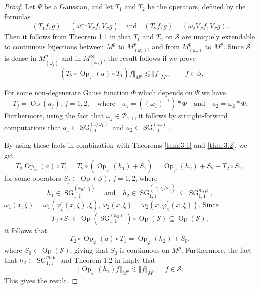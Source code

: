 \documentclass[12pt,a4paper,reqno]{amsart}
\numberwithin{equation}{section}
\numberwithin{thm}{section}
\theoremstyle{definition}
\theoremstyle{remark}
\begin{document}
\begin{proof}
Let $\Psi$ be a Gaussian, and let $T_1$ and $T_2$ be the operators, defined
by the formulas
$$
(T_1f,g) = (\omega _1^{-1}V_\Psi f,V_\Psi g)\quad \text{and}\quad(T_2f,g) =
(\omega _2V_\Psi f,V_\Psi g).
$$
Then it follows from Theorem 1.1 in \cite{GT} that $T_1$ and $T_2$
on $\mathscr S$ are uniquely extendable to continuous bijections between
$M^{p}$ to $M^{p}_{(\omega _1)}$, and from $M^{p}_{(\omega _2)}$
to $M^{p}$. Since ${{\mathscr S}}$ is dense in $M^p_{(\omega _j)}$ and in
$M^\infty _{(\omega _j)}$, the result follows if we prove
$$
{\Vert {(T_2 \circ {\operatorname{Op}}_\varphi(a)\circ T_1)f}\Vert _{{M^p}}}\lesssim {\Vert f\Vert _{{M^p}}},\qquad f\in {{\mathscr S}} .
$$

\par

For some non-degenerate Gauss function $\Phi$ which depends on $\Psi$
we have
$$
T_j = {\operatorname{Op}} ( a_j ),\ j=1,2,\quad \text{where}\quad
a_1= ((\omega _1)^{-1})*\Phi \quad \text{and}\quad
a_2 = \omega _2*\Phi .
$$
Furthermore, using the fact that $\omega _j\in {\mathscr P} _{1,1}$, it follows by
straight-forward computations that $a_1\in {\operatorname{SG}} ^{(1/\omega _1)}_{1,1}$ and
$a_2\in {\operatorname{SG}} ^{(\omega _2)}_{1,1}$.

\par

By using these facts in combination with Theorems \ref{thm:3.1} and
\ref{thm:3.2}, we get
$$
T_2 {\operatorname{Op}}_\varphi(a)\circ T_1 =T_2\circ ({\operatorname{Op}}_\varphi(h_1) +S_1) = {\operatorname{Op}}_\varphi(h_2)+
S_2+T_2\circ S_1,
$$
for some operators $S_j\in {\operatorname{Op}} ({{\mathscr S}} )$, $j=1,2$, where
$$
h_1\in {\operatorname{SG}} ^{(\omega _0/\widetilde{\omega} _1)}_{1,1}\quad \text{and}\quad
h_2\in {\operatorname{SG}} ^{(\omega _0\widetilde{\omega} _2/\widetilde{\omega} _1)}_{1,1}\subseteq
{\operatorname{SG}} ^{m,\mu}_{1,1},
$$
$\widetilde{\omega}_1(x,\xi)=\omega_1(\varphi^\prime_\xi(x,\xi),\xi)$, 
$\widetilde{\omega}_2(x,\xi)=\omega_2(x,\varphi^\prime_x(x,\xi) )$. Since
$$
T_2\circ S_1 \in {\operatorname{Op}} ({\operatorname{SG}} ^{(\omega _2)}_{1,1})\circ {\operatorname{Op}} (\mathscr S)
\subseteq {\operatorname{Op}} (\mathscr S),
$$
it follows that
$$
T_2 \circ {\operatorname{Op}}_\varphi(a)\circ T_1 = {\operatorname{Op}}_\varphi(h_2)+S_0,
$$
where $S_0\in {\operatorname{Op}} ({{\mathscr S}} )$, giving that $S_0$ is continuous on $M^p$.
Furthermore, the fact that $h_2\in {\operatorname{SG}} ^{m,\mu}_{1,1}$ and
Theorem 1.2 in \cite{CorNicRod1} imply that
$$
{\Vert {{\operatorname{Op}}_\varphi(h_1)f}\Vert _{{M^{p}}}}\lesssim {\Vert f\Vert _{{M^{p}}}},\quad f\in {{\mathscr S}} .
$$
This gives the result.
\end{proof}
\end{document}

